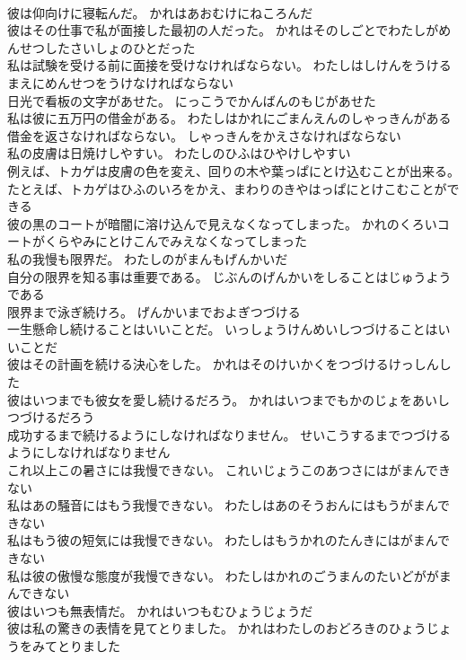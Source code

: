 \documentclass[8pt]{extreport}
\begin{document}
\begin{CJK}{UTF8}{min}
\\	彼は仰向けに寝転んだ。	かれはあおむけにねころんだ 
\\	彼はその仕事で私が面接した最初の人だった。	かれはそのしごとでわたしがめんせつしたさいしょのひとだった 
\\	私は試験を受ける前に面接を受けなければならない。	わたしはしけんをうけるまえにめんせつをうけなければならない 
\\	日光で看板の文字があせた。	にっこうでかんばんのもじがあせた 
\\	私は彼に五万円の借金がある。	わたしはかれにごまんえんのしゃっきんがある 
\\	借金を返さなければならない。	しゃっきんをかえさなければならない 
\\	私の皮膚は日焼けしやすい。	わたしのひふはひやけしやすい 
\\	例えば、トカゲは皮膚の色を変え、回りの木や葉っぱにとけ込むことが出来る。	たとえば、トカゲはひふのいろをかえ、まわりのきやはっぱにとけこむことができる 
\\	彼の黒のコートが暗闇に溶け込んで見えなくなってしまった。	かれのくろいコートがくらやみにとけこんでみえなくなってしまった 
\\	私の我慢も限界だ。	わたしのがまんもげんかいだ 
\\	自分の限界を知る事は重要である。	じぶんのげんかいをしることはじゅうようである 
\\	限界まで泳ぎ続けろ。	げんかいまでおよぎつづける 
\\	一生懸命し続けることはいいことだ。	いっしょうけんめいしつづけることはいいことだ 
\\	彼はその計画を続ける決心をした。	かれはそのけいかくをつづけるけっしんした 
\\	彼はいつまでも彼女を愛し続けるだろう。	かれはいつまでもかのじょをあいしつづけるだろう 
\\	成功するまで続けるようにしなければなりません。	せいこうするまでつづけるようにしなければなりません 
\\	これ以上この暑さには我慢できない。	これいじょうこのあつさにはがまんできない 
\\	私はあの騒音にはもう我慢できない。	わたしはあのそうおんにはもうがまんできない 
\\	私はもう彼の短気には我慢できない。	わたしはもうかれのたんきにはがまんできない 
\\	私は彼の傲慢な態度が我慢できない。	わたしはかれのごうまんのたいどががまんできない 
\\	彼はいつも無表情だ。	かれはいつもむひょうじょうだ 
\\	彼は私の驚きの表情を見てとりました。	かれはわたしのおどろきのひょうじょうをみてとりました 

\end{CJK}
\end{document}
